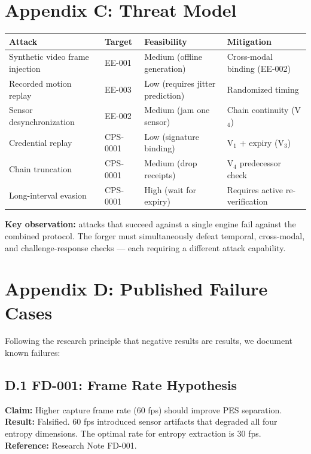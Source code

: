 \newpage
\section*{Appendix C: Threat Model}
\label{app:threat}

\begin{tabular}{|l|l|l|l|}
\hline
\textbf{Attack} & \textbf{Target} & \textbf{Feasibility} & \textbf{Mitigation} \\
\hline
Synthetic video frame injection & EE-001 & Medium (offline generation) & Cross-modal binding (EE-002) \\
Recorded motion replay & EE-003 & Low (requires jitter prediction) & Randomized timing \\
Sensor desynchronization & EE-002 & Medium (jam one sensor) & Chain continuity (V$_4$) \\
Credential replay & CPS-0001 & Low (signature binding) & V$_1$ + expiry (V$_3$) \\
Chain truncation & CPS-0001 & Medium (drop receipts) & V$_4$ predecessor check \\
Long-interval evasion & CPS-0001 & High (wait for expiry) & Requires active re-verification \\
\hline
\end{tabular}

\noindent\textbf{Key observation:} attacks that succeed against a single engine fail against the combined protocol. The forger must simultaneously defeat temporal, cross-modal, and challenge-response checks — each requiring a different attack capability.

\newpage
\section*{Appendix D: Published Failure Cases}
\label{app:failures}

Following the research principle that negative results are results, we document known failures:

\subsection*{D.1 FD-001: Frame Rate Hypothesis}

\textbf{Claim:} Higher capture frame rate (60 fps) should improve PES separation.
\textbf{Result:} Falsified. 60 fps introduced sensor artifacts that degraded all four entropy dimensions. The optimal rate for entropy extraction is 30 fps.
\textbf{Reference:} Research Note FD-001.

